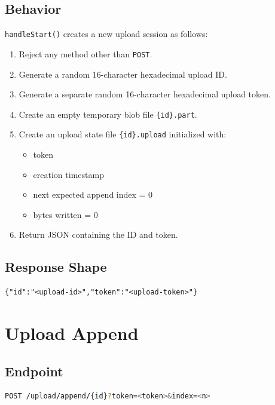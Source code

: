 \documentclass[11pt,a4paper]{report}
\begin{document}
\subsection{Behavior}

\texttt{handleStart()} creates a new upload session as follows:

\begin{enumerate}
    \item Reject any method other than \texttt{POST}.
    \item Generate a random 16-character hexadecimal upload ID.
    \item Generate a separate random 16-character hexadecimal upload token.
    \item Create an empty temporary blob file \texttt{\{id\}.part}.
    \item Create an upload state file \texttt{\{id\}.upload} initialized with:
    \begin{itemize}
        \item token
        \item creation timestamp
        \item next expected append index = 0
        \item bytes written = 0
    \end{itemize}
    \item Return JSON containing the ID and token.
\end{enumerate}

\subsection{Response Shape}

\begin{lstlisting}[language={}]
{"id":"<upload-id>","token":"<upload-token>"}
\end{lstlisting}

\section{Upload Append}

\subsection{Endpoint}

\begin{lstlisting}[language=bash]
POST /upload/append/{id}?token=<token>&index=<n>
\end{lstlisting}
\end{document}
